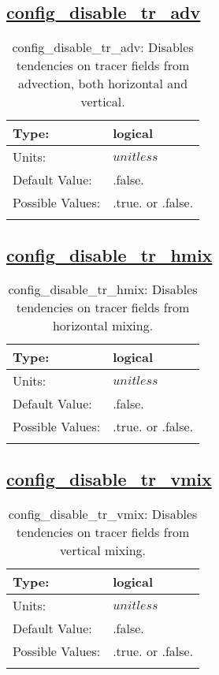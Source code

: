 \subsection[config\_disable\_tr\_adv]{\hyperref[sec:nm_tab_debug]{config\_disable\_tr\_adv}}
\label{subsec:nm_sec_config_disable_tr_adv}
\begin{center}
\begin{longtable}{| p{2.0in} || p{4.0in} |}
    \hline
    Type: & logical \\
    \hline
    Units: & $unitless$ \\
    \hline
    Default Value: & .false. \\
    \hline
    Possible Values: & .true. or .false. \\
    \hline
    \caption{config\_disable\_tr\_adv: Disables tendencies on tracer fields from advection, both horizontal and vertical.}
\end{longtable}
\end{center}
\subsection[config\_disable\_tr\_hmix]{\hyperref[sec:nm_tab_debug]{config\_disable\_tr\_hmix}}
\label{subsec:nm_sec_config_disable_tr_hmix}
\begin{center}
\begin{longtable}{| p{2.0in} || p{4.0in} |}
    \hline
    Type: & logical \\
    \hline
    Units: & $unitless$ \\
    \hline
    Default Value: & .false. \\
    \hline
    Possible Values: & .true. or .false. \\
    \hline
    \caption{config\_disable\_tr\_hmix: Disables tendencies on tracer fields from horizontal mixing.}
\end{longtable}
\end{center}
\subsection[config\_disable\_tr\_vmix]{\hyperref[sec:nm_tab_debug]{config\_disable\_tr\_vmix}}
\label{subsec:nm_sec_config_disable_tr_vmix}
\begin{center}
\begin{longtable}{| p{2.0in} || p{4.0in} |}
    \hline
    Type: & logical \\
    \hline
    Units: & $unitless$ \\
    \hline
    Default Value: & .false. \\
    \hline
    Possible Values: & .true. or .false. \\
    \hline
    \caption{config\_disable\_tr\_vmix: Disables tendencies on tracer fields from vertical mixing.}
\end{longtable}
\end{center}
